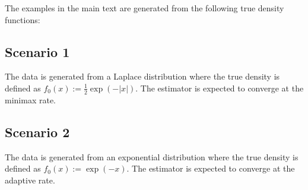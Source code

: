 \documentclass[12pt]{article}
\begin{document}
\begin{appendices}
The examples in the main text are generated from the following true density functions:
\subsection*{Scenario 1}
The data is generated from a Laplace distribution where the true density is defined as $f_0(x) := \frac{1}{2}\exp(-|x|)$. The estimator is expected to converge at the minimax rate. 

\subsection*{Scenario 2}
The data is generated from an exponential distribution where the true density is defined as $f_0(x) := \exp(-x)$. The estimator is expected to converge at the adaptive rate. 
\end{appendices}
\end{document}
